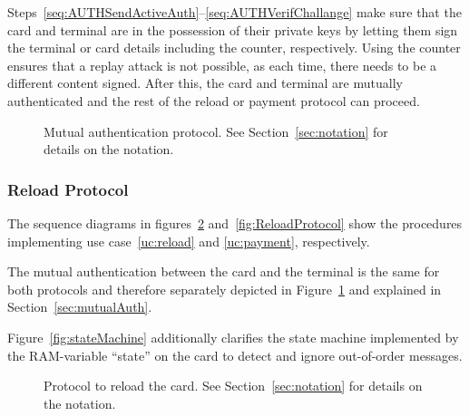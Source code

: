 \documentclass{article}
\begin{document}
Steps~\ref{seq:AUTHSendActiveAuth}--\ref{seq:AUTHVerifChallange} make sure that the card and terminal are in the possession of their private keys by letting them sign the terminal or card details including the counter, respectively.
Using the counter ensures that a replay attack is not possible, as each time, there needs to be a different content signed.
After this, the card and terminal are mutually authenticated and the rest of the reload or payment protocol can proceed.

\begin{figure}
    \centering
    
    \caption{Mutual authentication protocol.
    See Section~\ref{sec:notation} for details on the notation.
    }
    \label{fig:MutualAuth}
\end{figure}

\subsubsection{Reload Protocol}
The sequence diagrams in figures~\ref{fig:POSProtocol} and~\ref{fig:ReloadProtocol} show the procedures implementing use case~\ref{uc:reload} and \ref{uc:payment}, respectively.

The mutual authentication between the card and the terminal is the same for both protocols and therefore separately depicted in Figure~\ref{fig:MutualAuth} and explained in Section~\ref{sec:mutualAuth}.

Figure~\ref{fig:stateMachine} additionally clarifies the state machine implemented by the  RAM-variable ``state'' on the card to detect and ignore out-of-order messages.

\begin{figure}
    \centering
    
    \caption{Protocol to reload the card.
    See Section~\ref{sec:notation} for details on the notation.
    }
    \label{fig:POSProtocol}
\end{figure}
\end{document}
